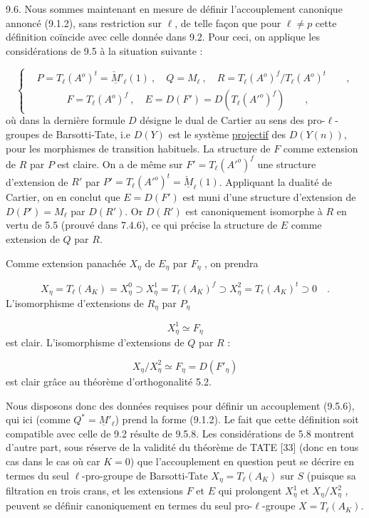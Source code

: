9.6.  Nous sommes maintenant en mesure de définir l'accouplement canonique annoncé (9.1.2), sans restriction sur $\ell$, de telle façon que pour $\ell \neq p$ cette définition coïncide avec celle donnée dans 9.2. Pour ceci, on applique les considérations de 9.5 à la situation suivante :

\begin{equation}\tag{9.6.1}
\left\{
\begin{aligned}
&P = T_\ell(A^o)^t = \check{\underline{M}}{}'_{\ell}(1) \ , \quad Q = M_\ell \ , \quad R = T_\ell(A^o)^f / T_\ell(A^o)^t \qquad , \\[4ex]
&\qquad\quad F = T_\ell(A^o)^f \ , \quad E = D(F') = D(T_\ell({A'}^o)^f) \qquad ,
\end{aligned}
\right.
\end{equation}
où dans la dernière formule $D$ désigne le dual de Cartier au sens des pro-$\ell$-groupes de Barsotti-Tate, i.e $D(Y)$ est le système \underline{projectif} des $D(Y(n))$, pour les morphismes de transition habituels. La structure de $F$ comme extension de $R$ par $P$ est claire. On a de même sur $F' = T_\ell({A'}^o)^f$ une structure d'extension de $R'$ par $P' = T_\ell({A'}^o)^t = \check{\underline{M}}_\ell(1)$. Appliquant la dualité de Cartier, on en conclut que $E = D(F')$ est muni d'une structure d'extension de $D(P') = M_\ell$ par $D(R')$. Or $D(R')$ est canoniquement isomorphe à $R$ en vertu de 5.5 (prouvé dans 7.4.6), ce qui précise la structure de $E$ comme extension de $Q$ par $R$.



Comme extension panachée $X_\eta$ de $E_\eta$ par $F_\eta$ , on prendra

\begin{equation}\tag{9.6.2}
X_\eta = T_\ell(A_K) = X^0_\eta \supset X^1_\eta = T_\ell(A_K)^f \supset X^2_\eta = T_\ell(A_K)^t \supset 0 \quad .
\end{equation}
L'isomorphisme d'extensions de $R_\eta$ par $P_\eta$

\begin{equation*}
X^1_\eta \simeq F_\eta
\end{equation*}
est clair. L'isomorphisme d'extensions de $Q$ par $R$ :

\begin{equation*}
X_\eta/X^2_\eta \simeq F_\eta = D(F'_\eta)
\end{equation*}
est clair grâce au théorème d'orthogonalité 5.2.

Nous disposons donc des données requises pour définir un accouplement (9.5.6), qui ici (comme $Q^* = \underline{M}'_\ell$) prend la forme (9.1.2). Le fait que cette définition soit compatible avec celle de 9.2 résulte de 9.5.8. Les considérations de 5.8 montrent d'autre part, sous réserve de la validité du théorème de TATE [33] (donc en tous cas dans le cas où car $K = 0$) que l'accouplement en question peut se décrire en termes du seul $\ell$-pro-groupe de Barsotti-Tate $X_\eta = T_\ell(A_K)$ sur $S$ (puisque sa filtration en trois crans, et les extensions $F$ et $E$ qui prolongent $X^1_\eta$ et $X_\eta/X^2_\eta$ , peuvent se définir canoniquement en termes du seul pro-$\ell$-groupe $X = T_\ell(A_K)$.

